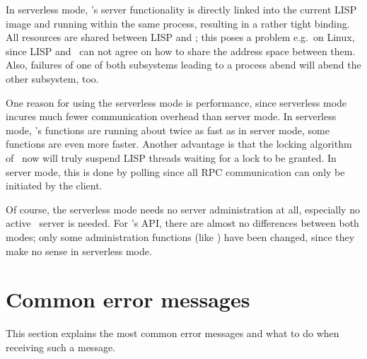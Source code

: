 In serverless mode, \plobwoexcl's server functionality is directly
linked into the current LISP image and running within the same
process, resulting in a rather tight binding. All resources are shared
between LISP and \plobwoexcl; this poses a problem e.g.\ on Linux,
since LISP and \plob\ can not agree on how to share the address space
between them. Also, failures of one of both subsystems leading to a
process abend will abend the other subsystem, too.

One reason for using the serverless mode is performance, since
serverless mode incures much fewer communication overhead than server
mode.  In serverless mode, \plobwoexcl's functions are running about
twice as fast as in server mode, some functions are even more
faster. Another advantage is that the locking algorithm of \plob\ now
will truly suspend LISP threads waiting for a lock to be granted. In
server mode, this is done by polling since all RPC communication can
only be initiated by the client.

Of course, the serverless mode needs no server administration at all,
especially no active \plob\ server is needed.  For \plobwoexcl's API,
there are almost no differences between both modes; only some
administration functions (like ) have been changed,
since they make no sense in serverless mode.

{\section{Common error messages}}%
\label{sec:CommonErrorMessages}

This section explains the most common error messages and what to do
when receiving such a message.

